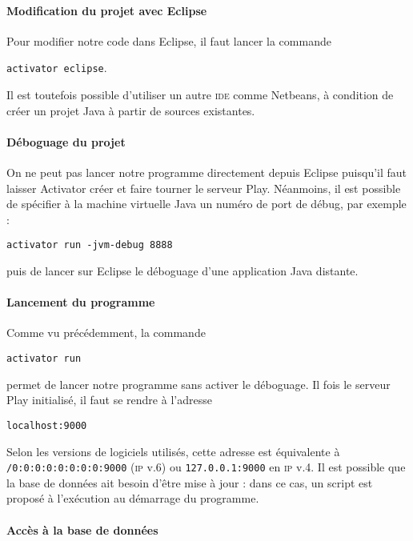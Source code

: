 \documentclass[11pt]{article}
\begin{document}
\paragraph{Modification du projet avec Eclipse}

Pour modifier notre code dans Eclipse, il faut lancer la commande
\begin{center}\texttt{activator eclipse}.\end{center}
Il est toutefois possible d'utiliser un autre \textsc{ide} comme Netbeans, à condition de créer un projet Java à partir de sources existantes.

\paragraph{Déboguage du projet}

On ne peut pas lancer notre programme directement depuis Eclipse puisqu'il faut laisser Activator créer et faire tourner le serveur Play. Néanmoins, il est possible de spécifier à la machine virtuelle Java un numéro de port de débug, par exemple :
\begin{center}\texttt{activator run -jvm-debug 8888}\end{center} puis de lancer sur Eclipse le déboguage d'une application Java distante.

\paragraph{Lancement du programme}

Comme vu précédemment, la commande
\begin{center}\texttt{activator run}\end{center}
permet de lancer notre programme sans activer le déboguage. Il fois le serveur Play initialisé, il faut se rendre à l'adresse
\begin{center}\texttt{localhost:9000}\end{center}
Selon les versions de logiciels utilisés, cette adresse est équivalente à \texttt{/0:0:0:0:0:0:0:0:9000} (\textsc{ip} v.6) ou \texttt{127.0.0.1:9000} en \textsc{ip} v.4. Il est possible que la base de données ait besoin d'être mise à jour : dans ce cas, un script est proposé à l'exécution au démarrage du programme.

\paragraph{Accès à la base de données}
\end{document}
